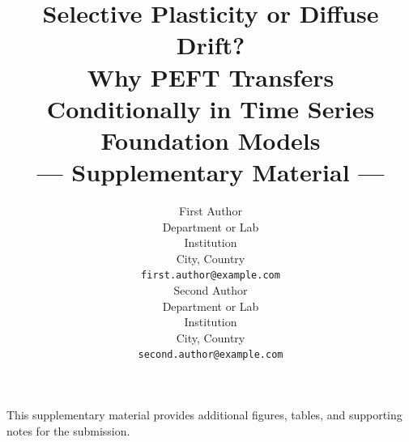 \documentclass{article}
\title{Selective Plasticity or Diffuse Drift?\\
Why PEFT Transfers Conditionally in Time Series Foundation Models\\
--- Supplementary Material ---}
\author{%
First Author \\
Department or Lab \\
Institution \\
City, Country \\
\texttt{first.author@example.com} \\
\And
Second Author \\
Department or Lab \\
Institution \\
City, Country \\
\texttt{second.author@example.com}
}
\begin{document}
\maketitle

This supplementary material provides additional figures, tables, and supporting notes for the submission.





\end{document}
